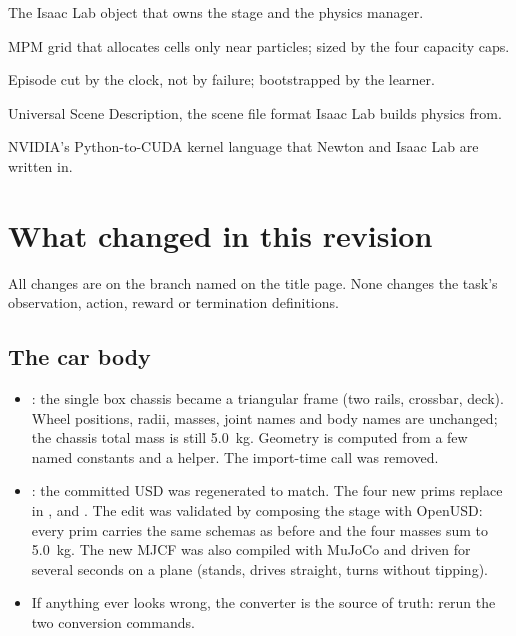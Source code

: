 \begin{description}[leftmargin=1.6em,font=\bfseries,itemsep=2pt]
  \item[SimulationContext] The Isaac Lab object that owns the stage and the
    physics manager.
  \item[Sparse grid] MPM grid that allocates cells only near particles; sized
    by the four capacity caps.
  \item[Time-out] Episode cut by the clock, not by failure; bootstrapped by
    the learner.
  \item[USD] Universal Scene Description, the scene file format Isaac Lab
    builds physics from.
  \item[Warp] NVIDIA's Python-to-CUDA kernel language that Newton and Isaac
    Lab are written in.
\end{description}

\chapter{What changed in this revision}
\label{app:changes}

All changes are on the branch named on the title page. None changes the
task's observation, action, reward or termination definitions.

\section*{The car body}
\begin{itemize}[leftmargin=1.6em]
  \item {}: the single box chassis became a triangular frame
    (two rails, crossbar, deck). Wheel positions, radii, masses, joint names
    and body names are unchanged; the chassis total mass is still 5.0~kg.
    Geometry is computed from a few named constants and a 
    helper. The import-time  call was removed.
  \item {}: the committed USD was regenerated to match.
    The four new  prims replace  in
    ,  and . The edit
    was validated by composing the stage with OpenUSD: every prim carries the
    same schemas as before and the four masses sum to 5.0~kg. The new MJCF
    was also compiled with MuJoCo and driven for several seconds on a plane
    (stands, drives straight, turns without tipping).
  \item If anything ever looks wrong, the converter is the source of truth:
    rerun the two conversion commands.
\end{itemize}

